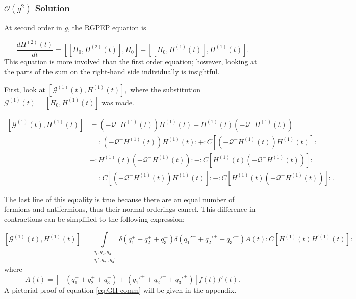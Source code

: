 \subsubsection{$\mathcal{O}(g^2)$ Solution}
\label{sec:second-order}

At second order in $g$, the RGPEP equation is

\begin{equation}
    \label{eq:second-order}
    \frac{dH^{(2)}(t)}{dt} = \left[\left[H_0, H^{(2)}(t)\right], H_0\right] + \left[\left[H_0, H^{(1)}(t)\right],H^{(1)}(t)\right].
\end{equation}
This equation is more involved than the first order equation; however, looking at the parts of the sum on the right-hand side individually is insightful.

First, look at $\left[\mathcal{G}^{(1)}(t),H^{(1)}(t)\right],$ where the substitution $\mathcal{G}^{(1)}(t) = \left[H_0, H^{(1)}(t)\right]$ was made.

\begin{align*}
    \left[\mathcal{G}^{(1)}(t),H^{(1)}(t)\right] &= \left(-\mathcal{Q}^- H^{(1)}(t)\right)H^{(1)}(t) - H^{(1)}(t)\left(-\mathcal{Q}^- H^{(1)}(t)\right)\\
    &= :\left(-\mathcal{Q}^- H^{(1)}(t)\right)H^{(1)}(t): + :C\left[\left(-\mathcal{Q}^- H^{(1)}(t)\right)H^{(1)}(t)\right]:\\
    & - :H^{(1)}(t)\left(-\mathcal{Q}^- H^{(1)}(t)\right): - :C\left[H^{(1)}(t)\left(-\mathcal{Q}^- H^{(1)}(t)\right)\right]:\\
    &= :C\left[\left(-\mathcal{Q}^- H^{(1)}(t)\right)H^{(1)}(t)\right]: - :C\left[H^{(1)}(t)\left(-\mathcal{Q}^- H^{(1)}(t)\right)\right]:.
\end{align*}

The last line of this equality is true because there are an equal number of fermions and antifermions, thus their normal orderings cancel.
This difference in contractions can be simplified to the following expression:

\begin{equation}
    \label{eq:GH-comm}
    \left[\mathcal{G}^{(1)}(t),H^{(1)}(t)\right] = \int\limits_{\substack{q_1, q_2, q_3 \\ q_1', q_2', q_3'}} \delta \left(q_1^+ + q_2^+ + q_3^+ \right)\delta \left(q_1'^+ + q_2'^+ + q_3'^+ \right)A(t):C\left[H^{(1)}(t)H^{'(1)}(t) \right]:
\end{equation}
where $$A(t) = \left[-\left(q_1^+ + q_2^+ + q_3^+ \right) + \left(q_1'^+ + q_2'^+ + q_3'^+ \right)\right]f(t) f'(t).$$
A pictorial proof of equation \ref{eq:GH-comm} will be given in the appendix.

